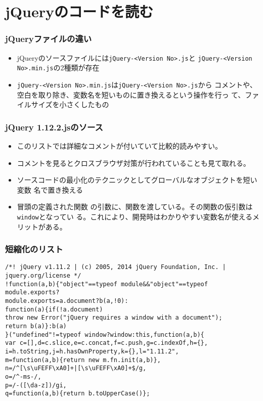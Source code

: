 \section{jQueryのコードを読む}
\begin{frame}[containsverbatim]
 \frametitle{jQueryファイルの違い}
\begin{itemize}
 \item jQueryのソースファイルには\texttt{jQuery-<Version No>.js}と
\texttt{jQuery-<Version No>.min.js}の2種類が存在
 \item \texttt{jQuery-<Version No>.min.js}は\texttt{jQuery-<Version No>.js}から
コメントや、空白を取り除き、変数名を短いものに置き換えるという操作を行っ
て、ファイルサイズを小さくしたもの
\end{itemize}

\end{frame}
\begin{frame}[containsverbatim]
 \frametitle{jQuery 1.12.2.jsのソース}
 \begin{itemize}
  \item このリストでは詳細なコメントが付いていて比較的読みやすい。
  \item コメントを見るとクロスブラウザ対策が行われていることも見て取れる。
  \item ソースコードの最小化のテクニックとしてグローバルなオブジェクトを短い変数
名で置き換える
  \item 冒頭の定義された関数
の引数に、関数を渡している。その関数の仮引数は\texttt{window}となってい
る。これにより、開発時はわかりやすい変数名が使えるメリットがある。
 \end{itemize}
\end{frame}
\begin{frame}[containsverbatim]
\frametitle{短縮化のリスト}
{\scriptsize
\begin{verbatim}
/*! jQuery v1.11.2 | (c) 2005, 2014 jQuery Foundation, Inc. | jquery.org/license */
!function(a,b){"object"==typeof module&&"object"==typeof module.exports?
module.exports=a.document?b(a,!0):
function(a){if(!a.document)
throw new Error("jQuery requires a window with a document");
return b(a)}:b(a)
}("undefined"!=typeof window?window:this,function(a,b){
var c=[],d=c.slice,e=c.concat,f=c.push,g=c.indexOf,h={},
i=h.toString,j=h.hasOwnProperty,k={},l="1.11.2",
m=function(a,b){return new m.fn.init(a,b)},
n=/^[\s\uFEFF\xA0]+|[\s\uFEFF\xA0]+$/g,
o=/^-ms-/,
p=/-([\da-z])/gi,
q=function(a,b){return b.toUpperCase()};
\end{verbatim}
}
\end{frame}
